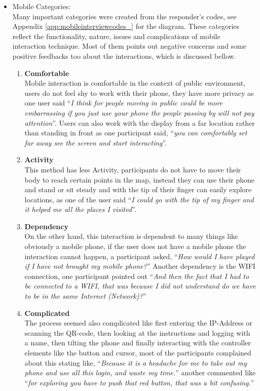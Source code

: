 \begin{itemize}

\item Mobile Categories: \\
Many important categories were created from the responder's codes, see Appendix \ref{app:mobileinterviewcodes_} for the diagram. These categories reflect the functionality, nature, issues and complications of mobile interaction technique. Most of them points out negative concerns and some positive feedbacks too about the interactions, which is discussed bellow.
\begin{enumerate}
\item	\textbf{Comfortable} \\
	Mobile interaction is comfortable in the context of public environment, users do not feel shy to work with their phone, they have more privacy as one user said ``\emph{I think for people moving in public could be more embarrassing if you just use your phone the people passing by will not pay attention}''. Users can also work with the display from a far location rather than standing in front as one participant said, ``\emph{you can comfortably set far away see the screen and start interacting}''.
\item	\textbf{Activity} \\
	This method has less Activity, participants do not have to move their body to reach certain points in the map, instead they can use their phone and stand or sit steady and with the tip of their finger can easily explore locations, as one of the user said ``\emph{I could go with the tip of my finger and it helped me all the places I visited}''.
\item	\textbf{Dependency}\\
	On the other hand, this interaction is dependent to many things like obviously a mobile phone, if the user does not have a mobile phone the interaction cannot happen, a participant asked, ``\emph{How would I have played if I have not brought my mobile phone?}'' Another dependency is the WIFI connection, one participant pointed out ``\emph{And then the fact that I had to be connected to a WIFI, that was because I did not understand do we have to be in the same Internet (Network)?}'' 

\item	\textbf{Complicated}\\
The process seemed also complicated like first entering the IP-Address or scanning the QR-code, then looking at the instructions and logging with a name, then tilting the phone and finally interacting with the controller elements like the button and cursor, most of the participants complained about this stating like, ``\emph{Because it is a headache for me to take out my phone and use all this login, and waste my time.}'' another commented like ``\emph{for exploring you have to push that red button, that was a bit confusing.}''



\end{enumerate}
\end{itemize}
